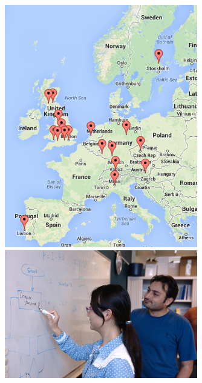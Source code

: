 \documentclass{beamer}
\begin{document}
\begin{frame}
\begin{columns}
 \begin{column}{0.4\textwidth}
  \begin{figure}[t]
  \centering
  \includegraphics[width=0.75\textwidth]{images/map} \vspace{0.6cm}\\
  \includegraphics[width=0.75\textwidth]{images/whiteboard1}
  \end{figure}
 \end{column}
 \end{columns}
\end{frame}
\end{document}
